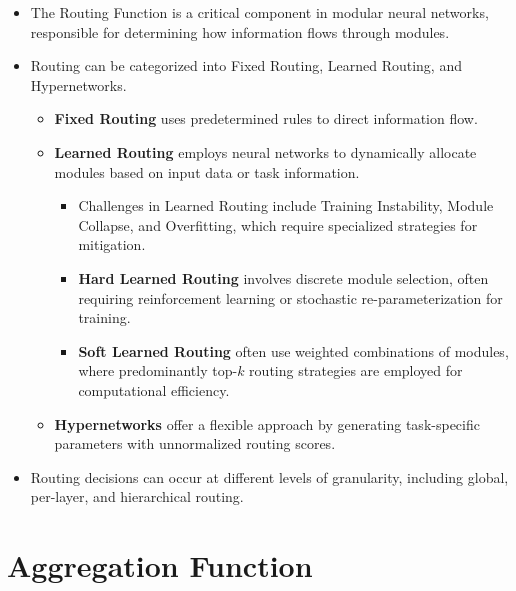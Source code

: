 \documentclass[10pt]{article} %
\begin{document}
\begin{tcolorbox}{
    \begin{itemize}
      \setlength\itemsep{-.1em}
        \item The Routing Function is a critical component in modular neural networks, responsible for determining how information flows through modules.
        \item Routing can be categorized into Fixed Routing, Learned Routing, and Hypernetworks.
        \begin{itemize}
            \item \textbf{Fixed Routing} uses predetermined rules to direct information flow.
            \item \textbf{Learned Routing} employs neural networks to dynamically allocate modules based on input data or task information.
            \begin{itemize}
                \item Challenges in Learned Routing include Training Instability, Module Collapse, and Overfitting, which require specialized strategies for mitigation.
             
                \item \textbf{Hard Learned Routing} involves discrete module selection, often requiring reinforcement learning or stochastic re-parameterization for training.
                \item \textbf{Soft Learned Routing} often use weighted combinations of modules, where predominantly top-$k$ routing strategies are employed for computational efficiency.
            \end{itemize}
            \item \textbf{Hypernetworks} offer a flexible approach by generating task-specific parameters with unnormalized routing scores.
        \end{itemize}
        \item Routing decisions can occur at different levels of granularity, including global, per-layer, and hierarchical routing.
        \end{itemize}
    }%
\end{tcolorbox}

\section{Aggregation Function}
\label{sec:compositionality}
 
\end{document}
